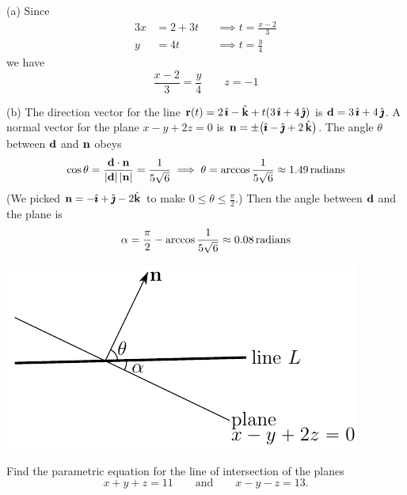 \begin{solution}
(a)  Since
\begin{alignat*}{3}
x&=2+3t &&\implies t=\frac{x-2}{3} \\
y&=4t   &&\implies t=\frac{y}{4}
\end{alignat*}
we have
\begin{equation*}
\frac{x-2}{3}=\frac{y}{4}\qquad z=-1
\end{equation*}

(b) The direction vector for the line 
   $\mathbf{r}(t) = 2\,\hat{\pmb{\imath}}-\hat{\mathbf{k}} +t(3\,\hat{\pmb{\imath}}+4\,\hat{\pmb{\jmath}})$
  is $\mathbf{d}=3\,\hat{\pmb{\imath}}+4\,\hat{\pmb{\jmath}}$. A normal vector for the plane $x-y+2z=0$ is 
   $\mathbf{n}=\pm\big(\hat{\pmb{\imath}}-\hat{\pmb{\jmath}}+2\,\hat{\mathbf{k}}\big)$. The angle $\theta$ between $\mathbf{d}$ 
   and $\mathbf{n}$ obeys
\begin{align*}
\cos\theta =\frac{\mathbf{d}\cdot\mathbf{n}}{|\mathbf{d}|\,|\mathbf{n}|}
           =\frac{1}{5\sqrt{6}}
\implies \theta =\arccos\frac{1}{5\sqrt{6}}\approx 1.49\,\text{radians}
\end{align*}
(We picked $\mathbf{n}=-\hat{\pmb{\imath}}+\hat{\pmb{\jmath}}-2\hat{\mathbf{k}}$ to make $0\le\theta\le\frac{\pi}{2}$.)
Then the angle between $\mathbf{d}$ and the plane is
\begin{equation*}
\alpha =\frac{\pi}{2}-\arccos\frac{1}{5\sqrt{6}}\approx 0.08\,\text{radians}
\end{equation*}

\begin{center}
     \includegraphics{fig/OE13D_1.pdf}
\end{center}


\end{solution}

\begin{question}[M200 2015D] %
Find the parametric equation for the line of intersection of the 
planes
\begin{equation*}
x + y + z = 11\qquad \text{and}\qquad x - y - z = 13.
\end{equation*}
\end{question}

